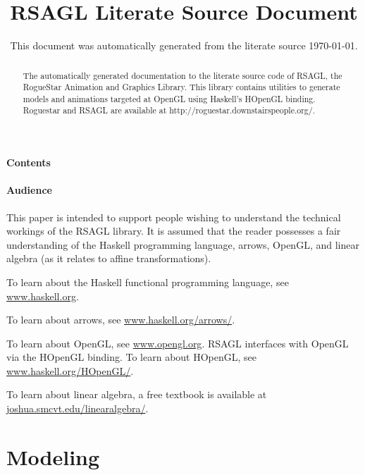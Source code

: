 \documentclass[pdftex]{article}
\title{ RSAGL Literate Source Document }
\date{ This document was automatically generated from the literate source \today. }
\begin{document}
\maketitle

\begin{abstract}
The automatically generated documentation to the literate source code of RSAGL, 
the RogueStar Animation and Graphics Library.  This library contains utilities
to generate models and animations targeted at OpenGL using Haskell's HOpenGL
binding.  Roguestar and RSAGL are available at http://roguestar.downstairspeople.org/.
\end{abstract}

\subsection{Contents}

\tableofcontents

\subsection{Audience}

This paper is intended to support people wishing to understand the technical workings of
the RSAGL library.  It is assumed that the reader possesses a fair understanding
of the Haskell programming language, arrows, OpenGL, and linear algebra (as it relates
to affine transformations).

To learn about the Haskell functional programming language, see 
\href{http://www.haskell.org/}{www.haskell.org}.

To learn about arrows, see 
\href{http://www.haskell.org/arrows/}{www.haskell.org/arrows/}.

To learn about OpenGL, see 
\href{http://www.opengl.org/}{www.opengl.org}.  
RSAGL interfaces with OpenGL via the HOpenGL binding.  To learn about HOpenGL, see 
\href{http://www.haskell.org/HOpenGL/}{www.haskell.org/HOpenGL/}.

To learn about linear algebra, a free textbook is available at 
\href{http://joshua.smcvt.edu/linearalgebra/}{joshua.smcvt.edu/linearalgebra/}.

\part{Modeling}












\end{document}
